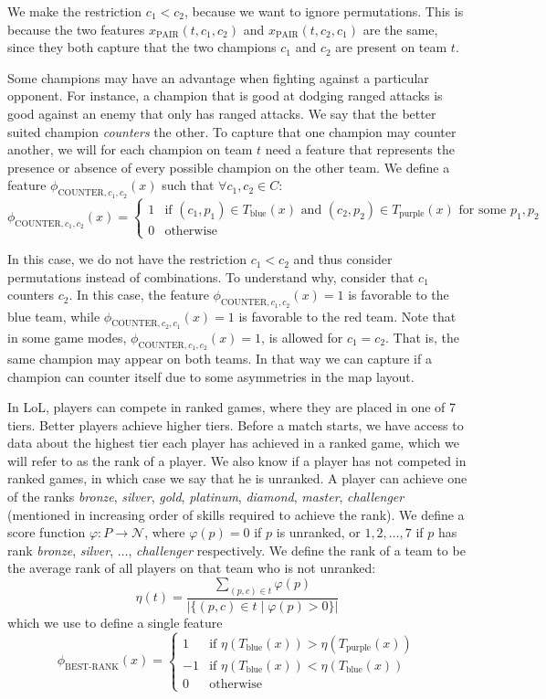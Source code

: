 We make the restriction $c_1 < c_2$, because we want to ignore permutations. This is because the two features $x_\text{PAIR}(t, c_1, c_2)$ and $x_\text{PAIR}(t, c_2, c_1)$ are the same, since they both capture that the two champions $c_1$ and $c_2$ are present on team $t$.

Some champions may have an advantage when fighting against a particular opponent.
For instance, a champion that is good at dodging ranged attacks is good against an enemy that only has ranged attacks.
We say that the better suited champion \emph{counters} the other.
To capture that one champion may counter another, we will for each champion on team $t$ need a feature that represents the presence or absence of every possible champion on the other team.
We define a feature $\phi_{\text{COUNTER},c_1,c_2}(x)$ such that $\forall c_1, c_2 \in C:$
\[\phi_{\text{COUNTER},c_1,c_2}(x) = 
\begin{cases} 
1 & \text{if } (c_1, p_1) \in T_\text{blue}(x) \text{ and } (c_2, p_2) \in T_\text{purple}(x) \text{ for some } p_1, p_2 \\ 
0 & \text{otherwise} 
\end{cases}\]

In this case, we do not have the restriction $c_1 < c_2$ and thus consider permutations instead of combinations.
To understand why, consider that $c_1$ counters $c_2$.
In this case, the feature $\phi_{\text{COUNTER},c_1,c_2}(x) = 1$ is favorable to the blue team, while $\phi_{\text{COUNTER},c_2,c_1}(x) = 1$ is favorable to the red team.
Note that in some game modes, $\phi_{\text{COUNTER},c_1,c_2}(x) = 1$, is allowed for $c_1 = c_2$. That is, the same champion may appear on both teams.
In that way we can capture if a champion can counter itself due to some asymmetries in the map layout.

In LoL, players can compete in ranked games, where they are placed in one of 7 tiers. Better players achieve higher tiers.
Before a match starts, we have access to data about the highest tier each player has achieved in a ranked game, which we will refer to as the rank of a player. We also know if a player has not competed in ranked games, in which case we say that he is unranked.
A player can achieve one of the ranks \textit{bronze}, \textit{silver}, \textit{gold}, \textit{platinum}, \textit{diamond}, \textit{master}, \textit{challenger} (mentioned in increasing order of skills required to achieve the rank).
We define a score function $\varphi : P \rightarrow \mathcal{N}$, where $\varphi(p) = 0$ if $p$ is unranked, or $1, 2, \dots, 7$ if $p$ has rank \textit{bronze}, \textit{silver}, $\dots$, \textit{challenger} respectively.
We define the rank of a team to be the average rank of all players on that team who is not unranked:
\[
\eta(t) = \frac{\sum\limits_{(p, c) \in t} \varphi(p)}{|\{(p, c) \in t \mid \varphi(p) > 0\}|}
\]
which we use to define a single feature
\[
\phi_\text{BEST-RANK}(x) = 
\begin{cases} 
  1 & \text{if } \eta(T_\text{blue}(x)) > \eta(T_\text{purple}(x))\\
  -1 & \text{if } \eta(T_\text{blue}(x)) < \eta(T_\text{blue}(x))\\
  0 & \text{otherwise} 
\end{cases}
\]

